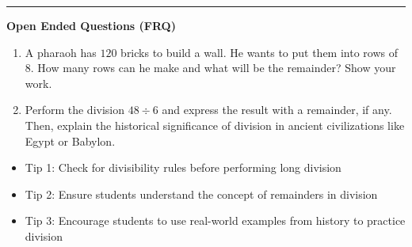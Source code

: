 \documentclass[10pt]{article}
\begin{document}
\vspace{-0.2cm}
\hrule
\vspace{0.2cm}
\textbf{\small Open Ended Questions (FRQ)}
\begin{enumerate}[label=\textbf{Q\arabic*.}, start=9, itemsep=5pt, topsep=0pt]

  \item \small A pharaoh has $120$ bricks to build a wall. He wants to put them into rows of $8$. How many rows can he make and what will be the remainder? Show your work. \vspace{2cm}

  \item \small Perform the division $48 \div 6$ and express the result with a remainder, if any. Then, explain the historical significance of division in ancient civilizations like Egypt or Babylon. \vspace{2cm}

\end{enumerate}

\vfill

\begin{tcolorbox}[colback=blue!5, colframe=mainblue!50, title=\small \textbf{Chef's Tips}, fonttitle=\bfseries, bottom=1mm]
\begin{itemize}[noitemsep, topsep=2pt, leftmargin=0.5cm]
  \item \scriptsize Tip 1: Check for divisibility rules before performing long division\item \scriptsize Tip 2: Ensure students understand the concept of remainders in division\item \scriptsize Tip 3: Encourage students to use real-world examples from history to practice division
\end{itemize}
\end{tcolorbox}
\end{document}
